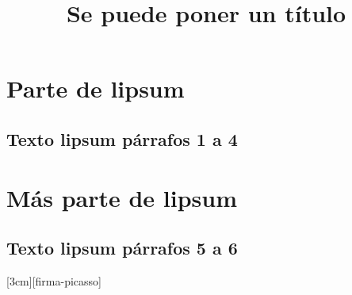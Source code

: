 \documentclass[numerado,carta]{plantillasEPS} %
\title{Se puede poner un título}
\begin{document}
\chapter{Parte de lipsum}
\section{Texto lipsum párrafos 1 a 4}

\lipsum[1-4]

\chapter{Más parte de lipsum}
\section{Texto lipsum párrafos 5 a 6}

\lipsum[5-6]


[3cm][firma-picasso] %
\end{document}
